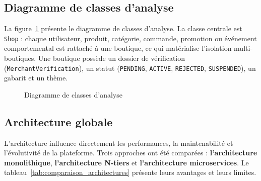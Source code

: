 \subsection{Diagramme de classes d'analyse}
La figure~\ref{fig:classes} présente le diagramme de classes d'analyse. La classe centrale est \texttt{Shop} : chaque utilisateur, produit, catégorie, commande, promotion ou événement comportemental est rattaché à une boutique, ce qui matérialise l'isolation multi-boutiques. Une boutique possède un dossier de vérification (\texttt{MerchantVerification}), un statut (\texttt{PENDING}, \texttt{ACTIVE}, \texttt{REJECTED}, \texttt{SUSPENDED}), un gabarit et un thème.
\begin{figure}[H]
    \centering
    \caption{Diagramme de classes d'analyse}
    \label{fig:classes}
\end{figure}

\subsection{Architecture globale}
L'architecture influence directement les performances, la maintenabilité et l'évolutivité de la plateforme. Trois approches ont été comparées : \textbf{l'architecture monolithique}, \textbf{l'architecture N-tiers} et \textbf{l'architecture microservices}.\newline
{}
Le tableau~\ref{tab:comparaison_architectures} présente leurs avantages et leurs limites.

